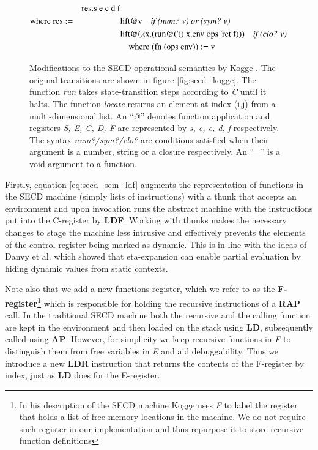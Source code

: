 \documentclass[a4paper,12pt,twoside,openright]{report}
\theoremstyle{definition}
\newcommand{\ts}{\textquotesingle}
\begin{document}
\begin{figure}[htp!]
\begin{alignat}{5}
		 && \text{res.s e c d f}   \\
		 \text{where res} & := && \text{lift@v\quad \textit{if (num? v) or (sym? v)}} \nonumber \\
		 & && \text{lift@($\lambda$x.(run@({\ts}() x.env ops {\ts}ret f)))} \quad\text{\textit{if (clo? v)}} \nonumber \\
		 & && \quad \text{where (fn (ops env))}:= \text{v} \nonumber
\end{alignat}
\caption{Modifications to the SECD operational semantics by Kogge \cite{kogge1990architecture}. The original transitions are shown in figure \ref{fig:secd_kogge}. The function \textit{run} takes state-transition steps according to \textit{C} until it halts. The function \textit{locate} returns an element at index (i,j) from a multi-dimensional list. An ``@'' denotes function application and registers \textit{S, E, C, D, F} are represented by \textit{s, e, c, d, f} respectively. The syntax \textit{num?/sym?/clo?} are conditions satisfied when their argument is a number, string or a closure respectively. An ``\_'' is a void argument to a function.}
\label{fig:secd_semantics_noset}
\end{figure}
\endgroup
\newpage

Firstly, equation \ref{eq:secd_sem_ldf} augments the representation of functions in the SECD machine (simply lists of instructions) with a thunk that accepts an environment and upon invocation runs the abstract machine with the instructions put into the C-register by \textbf{LDF}. Working with thunks makes the necessary changes to stage the machine less intrusive and effectively prevents the elements of the control register being marked as dynamic. This is in line with the ideas of Danvy et al. \cite{danvy1995essence} which showed that eta-expansion can enable partial evaluation by hiding dynamic values from static contexts.

Note also that we add a new functions register, which we refer to as the \textbf{F-register}\footnote{In his description of the SECD machine Kogge \cite{kogge1990architecture} uses \textit{F} to label the register that holds a list of free memory locations in the machine. We do not require such register in our implementation and thus repurpose it to store recursive function definitions} which is responsible for holding the recursive instructions of a \textbf{RAP} call. In the traditional SECD machine both the recursive and the calling function are kept in the environment and then loaded on the stack using \textbf{LD}, subsequently called using \textbf{AP}. However, for simplicity we keep recursive functions in \textit{F} to distinguish them from free variables in \textit{E} and aid debuggability. Thus we introduce a new \textbf{LDR} instruction that returns the contents of the F-register by index, just as \textbf{LD} does for the E-register.
\end{document}
